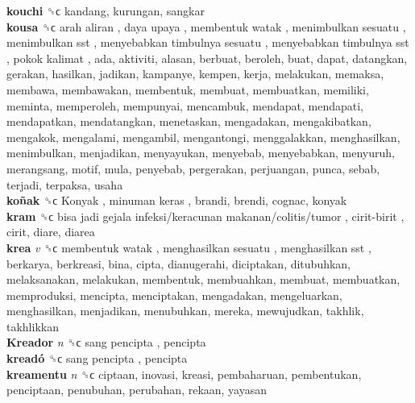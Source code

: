 \textbf{kouchi} ␝ϲ  kandang, kurungan, sangkar  \\
\textbf{kousa} ␝ϲ   arah aliran ,  daya upaya ,  membentuk watak ,  menimbulkan sesuatu ,  menimbulkan sst ,  menyebabkan timbulnya sesuatu ,  menyebabkan timbulnya sst ,  pokok kalimat , ada, aktiviti, alasan, berbuat, beroleh, buat, dapat, datangkan, gerakan, hasilkan, jadikan, kampanye, kempen, kerja, melakukan, memaksa, membawa, membawakan, membentuk, membuat, membuatkan, memiliki, meminta, memperoleh, mempunyai, mencambuk, mendapat, mendapati, mendapatkan, mendatangkan, menetaskan, mengadakan, mengakibatkan, mengakok, mengalami, mengambil, mengantongi, menggalakkan, menghasilkan, menimbulkan, menjadikan, menyayukan, menyebab, menyebabkan, menyuruh, merangsang, motif, mula, penyebab, pergerakan, perjuangan, punca, sebab, terjadi, terpaksa, usaha  \\
\textbf{koñak} ␝ϲ   Konyak ,  minuman keras , brandi, brendi, cognac, konyak  \\
\textbf{kram} ␝ϲ   bisa jadi gejala infeksi/keracunan makanan/colitis/tumor ,  cirit-birit , cirit, diare, diarea  \\
\textbf{krea} \emph{v}  ␝ϲ   membentuk watak ,  menghasilkan sesuatu ,  menghasilkan sst , berkarya, berkreasi, bina, cipta, dianugerahi, diciptakan, ditubuhkan, melaksanakan, melakukan, membentuk, membuahkan, membuat, membuatkan, memproduksi, mencipta, menciptakan, mengadakan, mengeluarkan, menghasilkan, menjadikan, menubuhkan, mereka, mewujudkan, takhlik, takhlikkan  \\
\textbf{Kreador} \emph{n}  ␝ϲ   sang pencipta , pencipta  \\
\textbf{kreadó} ␝ϲ   sang pencipta , pencipta  \\
\textbf{kreamentu} \emph{n}  ␝ϲ  ciptaan, inovasi, kreasi, pembaharuan, pembentukan, penciptaan, penubuhan, perubahan, rekaan, yayasan  \\
